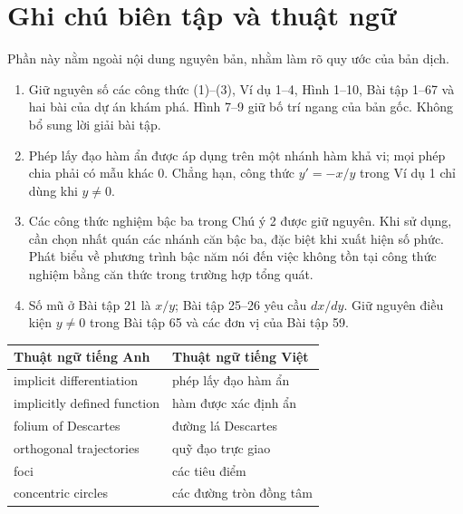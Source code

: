 \documentclass[12pt,a4paper]{article}
\begin{document}
\section*{Ghi chú biên tập và thuật ngữ}
Phần này nằm ngoài nội dung nguyên bản, nhằm làm rõ quy ước của bản dịch.
\begin{enumerate}[leftmargin=*]
\item Giữ nguyên số các công thức (1)–(3), Ví dụ 1–4, Hình 1–10, Bài tập 1–67 và hai bài của dự án khám phá. Hình 7–9 giữ bố trí ngang của bản gốc. Không bổ sung lời giải bài tập.
\item Phép lấy đạo hàm ẩn được áp dụng trên một nhánh hàm khả vi; mọi phép chia phải có mẫu khác $0$. Chẳng hạn, công thức $y'=-x/y$ trong Ví dụ 1 chỉ dùng khi $y\ne0$.
\item Các công thức nghiệm bậc ba trong Chú ý 2 được giữ nguyên. Khi sử dụng, cần chọn nhất quán các nhánh căn bậc ba, đặc biệt khi xuất hiện số phức. Phát biểu về phương trình bậc năm nói đến việc không tồn tại công thức nghiệm bằng căn thức trong trường hợp tổng quát.
\item Số mũ ở Bài tập 21 là $x/y$; Bài tập 25–26 yêu cầu $dx/dy$. Giữ nguyên điều kiện $y\ne0$ trong Bài tập 65 và các đơn vị của Bài tập 59.
\end{enumerate}
\begin{longtable}{p{.43\linewidth}p{.49\linewidth}}
\toprule Thuật ngữ tiếng Anh & Thuật ngữ tiếng Việt\\\midrule
implicit differentiation & phép lấy đạo hàm ẩn\\
implicitly defined function & hàm được xác định ẩn\\
folium of Descartes & đường lá Descartes\\
orthogonal trajectories & quỹ đạo trực giao\\
foci & các tiêu điểm\\
concentric circles & các đường tròn đồng tâm\\
\bottomrule
\end{longtable}
\end{document}
